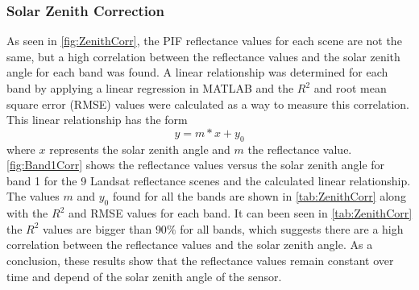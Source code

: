 \subsubsection{Solar Zenith Correction}

As seen in \autoref{fig:ZenithCorr}, the PIF reflectance values for each scene are not the same, but a high correlation between the reflectance values and the solar zenith angle for each band was found. A linear relationship was determined for each band by applying a linear regression in MATLAB and the $R^2$ and root mean square error (RMSE) values were calculated as a way to measure this correlation. This linear relationship has the form 
\begin{equation}
	y = m*x + y_0
	\label{eq:linear}
\end{equation}
where $x$ represents the solar zenith angle and $m$ the reflectance value. \autoref{fig:Band1Corr} shows the reflectance values versus the solar zenith angle for band 1 for the 9 Landsat reflectance scenes and the calculated linear relationship. The values $m$ and $y_0$ found for all the bands are shown in \autoref{tab:ZenithCorr} along with the $R^2$ and RMSE values for each band. It can been seen in \autoref{tab:ZenithCorr} the $R^2$ values are bigger than $90\%$ for all bands, which suggests there are a high correlation between the reflectance values and the solar zenith angle. As a conclusion, these results show that the reflectance values remain constant over time and depend of the solar zenith angle of the sensor. 

